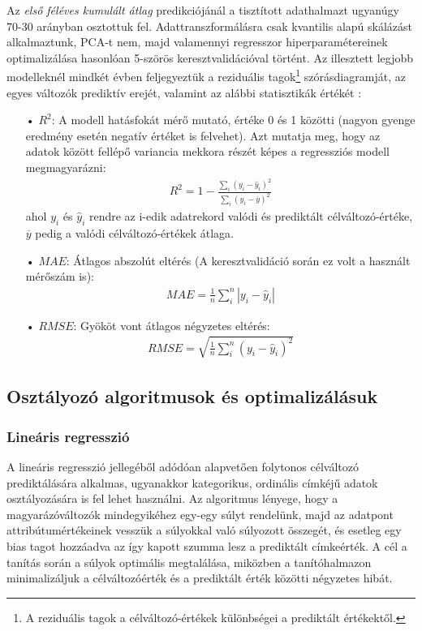 \documentclass[12pt]{article}
\begin{document}
Az \textit{első féléves kumulált átlag} predikciójánál a tisztított adathalmazt ugyanúgy 70-30 arányban osztottuk fel. Adattranszformálásra csak kvantilis alapú skálázást alkalmaztunk, PCA-t nem, majd valamennyi regresszor hiperparamétereinek optimalizálása hasonlóan 5-szörös keresztvalidációval történt. Az illesztett legjobb modelleknél mindkét évben feljegyeztük a reziduális tagok\footnote{A reziduális tagok a célváltozó-értékek különbségei a prediktált értékektől.} szórásdiagramját, az egyes változók prediktív erejét, valamint az alábbi statisztikák értékét \cite{bolla_stat}:
\begin{itemize}
\item[•] $R^2$: A modell hatásfokát mérő mutató, értéke 0 és 1 közötti (nagyon gyenge eredmény esetén negatív értéket is felvehet). Azt mutatja meg, hogy az adatok között fellépő variancia mekkora részét képes a regressziós modell megmagyarázni:
\begin{align}
R^2 = 1 - \frac{\sum_i (y_i - \hat{y}_i)^2}{\sum_i (y_i - \overline{y})^2}
\end{align} 
ahol $y_i$ és $\hat{y}_i$ rendre az i-edik adatrekord valódi és prediktált célváltozó-értéke, $\overline{y}$ pedig a valódi célváltozó-értékek átlaga.
\item[•] $MAE$: Átlagos abszolút eltérés (A keresztvalidáció során ez volt a használt mérőszám is):
\begin{align}
MAE = \frac{1}{n}\sum_i^n |y_i -\hat{y}_i| 
\end{align}
\item[•] $RMSE$: Gyököt vont átlagos négyzetes eltérés:
\begin{align}
RMSE = \sqrt{\frac{1}{n}\sum_i^n (y_i - \hat{y}_i)^2}
\end{align}
\end{itemize}






\subsection{Osztályozó algoritmusok és optimalizálásuk}

\subsubsection{Lineáris regresszió}

A lineáris regresszió jellegéből adódóan alapvetően folytonos célváltozó prediktálására alkalmas, ugyanakkor kategorikus, ordinális címkéjű adatok osztályozására is fel lehet használni. Az algoritmus lényege, hogy a magyarázóváltozók mindegyikéhez egy-egy súlyt rendelünk, majd az adatpont attribútumértékeinek vesszük a súlyokkal való súlyozott összegét, és esetleg egy bias tagot hozzáadva az így kapott szumma lesz a prediktált címkeérték. A cél a tanítás során a súlyok optimális megtalálása, miközben a tanítóhalmazon minimalizáljuk a célváltozóérték és a prediktált érték közötti négyzetes hibát.
\end{document}
